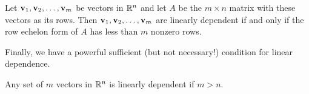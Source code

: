 \documentclass[../m073main.tex]{subfiles}
\begin{document}
\begin{theorem}
	Let $\mathbf{v}_1, \mathbf{v}_2, \ldots, \mathbf{v}_m$ be vectors in $\mathbb{R}^n$ and let $A$ be the $m \times n$ matrix with these vectors as its rows.
	Then $\mathbf{v}_1, \mathbf{v}_2, \ldots, \mathbf{v}_m$ are linearly dependent if and only if the row echelon form of $A$ has less than $m$ nonzero rows.
\end{theorem}

Finally, we have a powerful sufficient (but not necessary!) condition for linear dependence.

\begin{theorem}
	Any set of $m$ vectors in $\mathbb{R}^n$ is linearly dependent if $m > n$.
\end{theorem}
\end{document}
